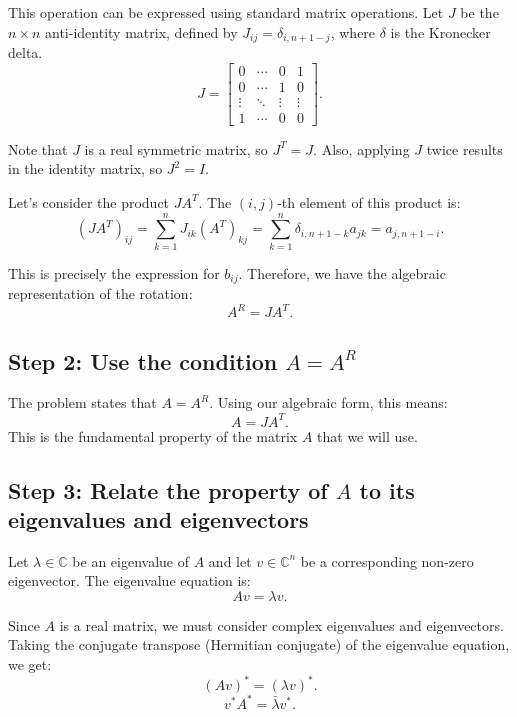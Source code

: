 \documentclass[12pt,a4paper]{article}
\theoremstyle{definition}
\begin{document}
        This operation can be expressed using standard matrix operations. Let $J$ be the $n \times n$ anti-identity matrix, defined by $J_{ij} = \delta_{i, n+1-j}$, where $\delta$ is the Kronecker delta.
        \[
            J = \begin{bmatrix}
                    0 & \cdots & 0 & 1 \\
                    0 & \cdots & 1 & 0 \\
                    \vdots & \ddots & \vdots & \vdots \\
                    1 & \cdots & 0 & 0
            \end{bmatrix}.
        \]

        Note that $J$ is a real symmetric matrix, so $J^T = J$. Also, applying $J$ twice results in the identity matrix, so $J^2 = I$.

        Let's consider the product $JA^T$. The $(i, j)$-th element of this product is:
        \[ (JA^T)_{ij} = \sum_{k=1}^n J_{ik} (A^T)_{kj} = \sum_{k=1}^n \delta_{i, n+1-k} a_{jk} = a_{j, n+1-i}. \]

        This is precisely the expression for $b_{ij}$. Therefore, we have the algebraic representation of the rotation:
        \[ A^R = JA^T. \]

        \subsection*{Step 2: Use the condition $A = A^R$}

        The problem states that $A = A^R$. Using our algebraic form, this means:
        \[ A = JA^T. \]
        This is the fundamental property of the matrix $A$ that we will use.

        \subsection*{Step 3: Relate the property of $A$ to its eigenvalues and eigenvectors}

        Let $\lambda \in \mathbb{C}$ be an eigenvalue of $A$ and let $v \in \mathbb{C}^n$ be a corresponding non-zero eigenvector. The eigenvalue equation is:
        \[ Av = \lambda v. \]

        Since $A$ is a real matrix, we must consider complex eigenvalues and eigenvectors.
        Taking the conjugate transpose (Hermitian conjugate) of the eigenvalue equation, we get:
        \[ (Av)^* = (\lambda v)^*. \]
        \[ v^* A^* = \bar{\lambda} v^*. \]
\end{document}
